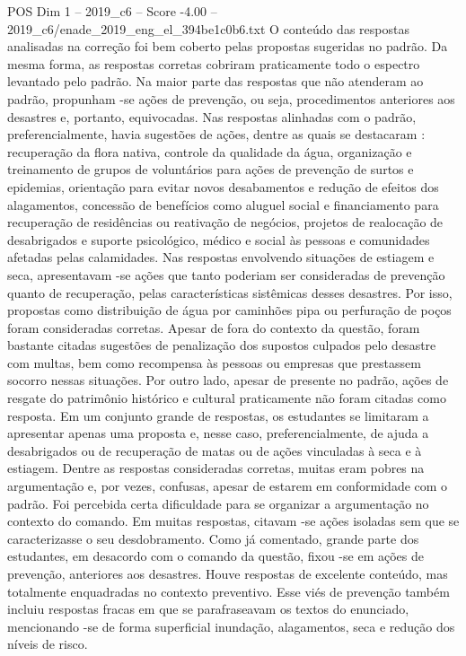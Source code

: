 \begin{textsample}{POS Dim 1 – 2019\_c6 – Score -4.00 – 2019\_c6/enade\_2019\_eng\_el\_394be1c0b6.txt}
O conteúdo das respostas analisadas na correção foi bem coberto pelas propostas sugeridas no padrão.
Da mesma forma, as respostas corretas cobriram praticamente todo o espectro levantado pelo padrão.
Na maior parte das respostas que não atenderam ao padrão, propunham -se ações de prevenção, ou seja, procedimentos anteriores aos desastres e, portanto, equivocadas.
Nas respostas alinhadas com o padrão, preferencialmente, havia sugestões de ações, dentre as quais se destacaram : recuperação da flora nativa, controle da qualidade da água, organização e treinamento de grupos de voluntários para ações de prevenção de surtos e epidemias, orientação para evitar novos desabamentos e redução de efeitos dos alagamentos, concessão de benefícios como aluguel social e financiamento para recuperação de residências ou reativação de negócios, projetos de realocação de desabrigados e suporte psicológico, médico e social às pessoas e comunidades afetadas pelas calamidades.
Nas respostas envolvendo situações de estiagem e seca, apresentavam -se ações que tanto poderiam ser consideradas de prevenção quanto de recuperação, pelas características sistêmicas desses desastres.
Por isso, propostas como distribuição de água por caminhões pipa ou perfuração de poços foram consideradas corretas.
Apesar de fora do contexto da questão, foram bastante citadas sugestões de penalização dos supostos culpados pelo desastre com multas, bem como recompensa às pessoas ou empresas que prestassem socorro nessas situações.
Por outro lado, apesar de presente no padrão, ações de resgate do patrimônio histórico e cultural praticamente não foram citadas como resposta.
Em um conjunto grande de respostas, os estudantes se limitaram a apresentar apenas uma proposta e, nesse caso, preferencialmente, de ajuda a desabrigados ou de recuperação de matas ou de ações vinculadas à seca e à estiagem.
Dentre as respostas consideradas corretas, muitas eram pobres na argumentação e, por vezes, confusas, apesar de estarem em conformidade com o padrão.
Foi percebida certa dificuldade para se organizar a argumentação no contexto do comando.
Em muitas respostas, citavam -se ações isoladas sem que se caracterizasse o seu desdobramento.
Como já comentado, grande parte dos estudantes, em desacordo com o comando da questão, fixou -se em ações de prevenção, anteriores aos desastres.
Houve respostas de excelente conteúdo, mas totalmente enquadradas no contexto preventivo.
Esse viés de prevenção também incluiu respostas fracas em que se parafraseavam os textos do enunciado, mencionando -se de forma superficial inundação, alagamentos, seca e redução dos níveis de risco.

\end{textsample}
